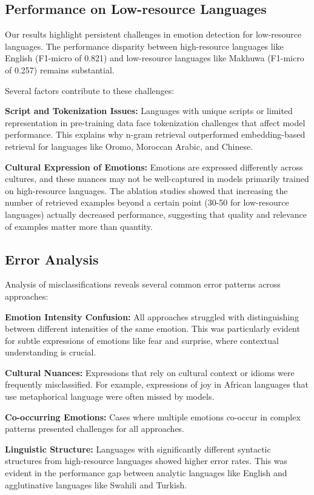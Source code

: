 \documentclass[a4paper,12pt]{extarticle}
\begin{document}
\subsection{Performance on Low-resource Languages}

Our results highlight persistent challenges in emotion detection for low-resource languages. The performance disparity between high-resource languages like English (F1-micro of 0.821) and low-resource languages like Makhuwa (F1-micro of 0.257) remains substantial.

Several factors contribute to these challenges:

\textbf{Script and Tokenization Issues:} Languages with unique scripts or limited representation in pre-training data face tokenization challenges that affect model performance. This explains why n-gram retrieval outperformed embedding-based retrieval for languages like Oromo, Moroccan Arabic, and Chinese.

\textbf{Cultural Expression of Emotions:} Emotions are expressed differently across cultures, and these nuances may not be well-captured in models primarily trained on high-resource languages. The ablation studies showed that increasing the number of retrieved examples beyond a certain point (30-50 for low-resource languages) actually decreased performance, suggesting that quality and relevance of examples matter more than quantity.

\subsection{Error Analysis}

Analysis of misclassifications reveals several common error patterns across approaches:

\textbf{Emotion Intensity Confusion:} All approaches struggled with distinguishing between different intensities of the same emotion. This was particularly evident for subtle expressions of emotions like fear and surprise, where contextual understanding is crucial.

\textbf{Cultural Nuances:} Expressions that rely on cultural context or idioms were frequently misclassified. For example, expressions of joy in African languages that use metaphorical language were often missed by models.

\textbf{Co-occurring Emotions:} Cases where multiple emotions co-occur in complex patterns presented challenges for all approaches.

\textbf{Linguistic Structure:} Languages with significantly different syntactic structures from high-resource languages showed higher error rates. This was evident in the performance gap between analytic languages like English and agglutinative languages like Swahili and Turkish.
\end{document}
